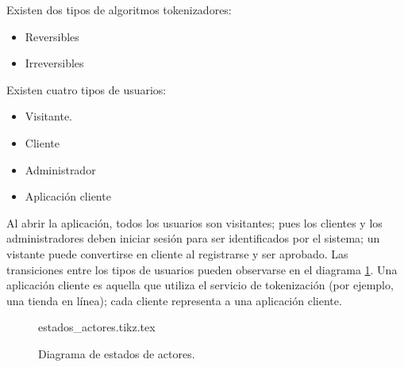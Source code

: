 {
  Existen dos tipos de algoritmos tokenizadores:
  \begin{itemize}
    \item Reversibles
    \item Irreversibles
  \end{itemize}
}

{
  Existen cuatro tipos de usuarios:
  \begin{itemize}
    \item Visitante.
    \item Cliente
    \item Administrador
    \item Aplicación cliente
  \end{itemize}

  \begin{hangparas}{2em}{0}
    Al abrir la aplicación, todos los usuarios son visitantes; pues los clientes
    y los administradores deben iniciar sesión para ser identificados por el
    sistema; un vistante puede convertirse en cliente al registrarse y ser
    aprobado. Las transiciones entre los tipos de usuarios pueden observarse en
    el diagrama \ref{estados_actores}. Una aplicación cliente es aquella que
    utiliza el servicio de tokenización (por ejemplo, una tienda en línea); cada
    cliente representa a una aplicación cliente.
  \end{hangparas}
}

\begin{figure}
  \begin{center}
    {estados_actores.tikz.tex}
    \caption{Diagrama de estados de actores.}
    \label{estados_actores}
  \end{center}
\end{figure}

